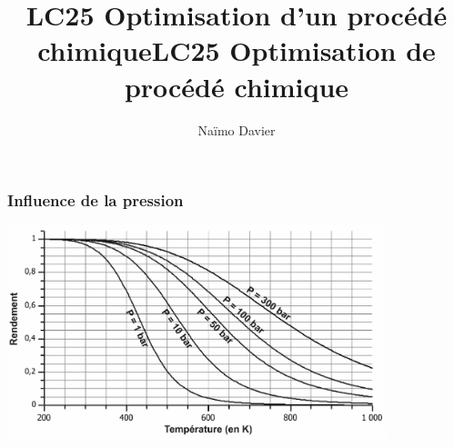 \documentclass{beamer}
\title{LC25 Optimisation d'un procédé chimique}
\author{Naïmo Davier}
\institute{Université Paul sabatier}
\begin{document}
	
\begin{frame}
	\titlepage
\end{frame}

\addtocounter{framenumber}{-1}
\title{LC25 Optimisation de procédé chimique}

\begin{frame}

\frametitle{Influence de la pression}
\centerline{\includegraphics[width=11cm]{pression}}
\end{frame}
\end{document}
